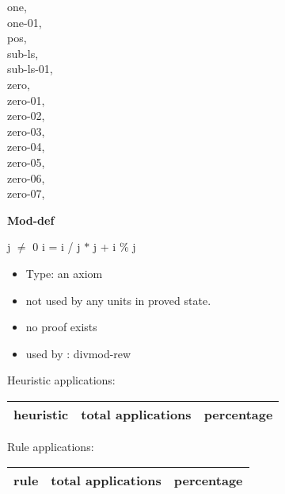 \documentclass[a4paper]{article}
\begin{document}
{\begin{multicols}{3}
one, \pageref{lemma-one}\\
one-01, \pageref{lemma-one-01}\\
pos, \pageref{lemma-pos}\\
sub-ls, \pageref{lemma-sub-ls}\\
sub-ls-01, \pageref{lemma-sub-ls-01}\\
zero, \pageref{lemma-zero}\\
zero-01, \pageref{lemma-zero-01}\\
zero-02, \pageref{lemma-zero-02}\\
zero-03, \pageref{lemma-zero-03}\\
zero-04, \pageref{lemma-zero-04}\\
zero-05, \pageref{lemma-zero-05}\\
zero-06, \pageref{lemma-zero-06}\\
zero-07, \pageref{lemma-zero-07}\\

\end{multicols}}

\pagebreak

{\LARGE\bf Mod-def}\label{lemma-Mod-def}

\medskip

 \Fol j $\neq$ 0 \Imp i = i / j $*$ j + i \% j

\begin{itemize}

\item Type: an axiom

\item not used by any units in proved state.
\item       no proof exists
\item       used by      : divmod-rew
\end{itemize}

\medskip


Heuristic applications:

\begin{supertabular}{l|r|r}
heuristic	& total applications & percentage \\ \hline

\end{supertabular}

Rule applications:

\begin{supertabular}{l|r|r}
rule	        & total applications & percentage \\ \hline

\end{supertabular}
\end{document}
